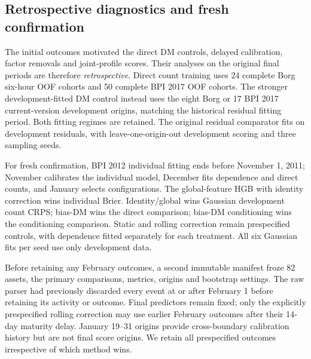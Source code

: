 \subsection{Retrospective diagnostics and fresh confirmation}
The initial outcomes motivated the direct DM controls, delayed calibration,
factor removals and joint-profile scores. Their analyses on the original
final periods are therefore \emph{retrospective}. Direct count training uses
24 complete Borg six-hour OOF cohorts and 50 complete BPI 2017 OOF cohorts.
The stronger development-fitted DM control instead uses the eight Borg or
17 BPI 2017 current-version development origins, matching the historical
residual fitting period. Both fitting regimes are retained.
The original residual comparator fits on development residuals,
with leave-one-origin-out development scoring and three sampling seeds.

For fresh confirmation, BPI 2012 individual fitting ends before November 1,
2011; November calibrates the individual model, December fits dependence and
direct counts, and January selects configurations. The global-feature HGB
with identity correction wins individual Brier. Identity/global wins
Gaussian development count CRPS; bias-DM wins the direct comparison;
bias-DM conditioning wins the conditioning comparison. Static and rolling
correction remain prespecified controls, with dependence fitted separately
for each treatment. All six Gaussian fits per seed use only development
data.

Before retaining any February outcomes, a second immutable manifest froze
82 assets, the primary comparisons, metrics, origins and bootstrap settings.
The raw parser had previously discarded every event at or after February 1
before retaining its activity or outcome. Final predictors remain fixed;
only the explicitly prespecified rolling correction may use earlier
February outcomes after their 14-day maturity delay. January 19--31 origins
provide cross-boundary calibration history but are not final score origins.
We retain all prespecified outcomes irrespective of which method wins.

